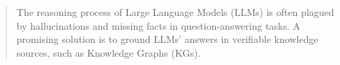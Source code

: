 \begin{abstract}
The reasoning process of  Large Language Models (LLMs) is often plagued by hallucinations and missing facts in question-answering tasks.
A promising solution is to ground LLMs' answers in verifiable knowledge sources, such as Knowledge Graphs (KGs).

\end{abstract}
